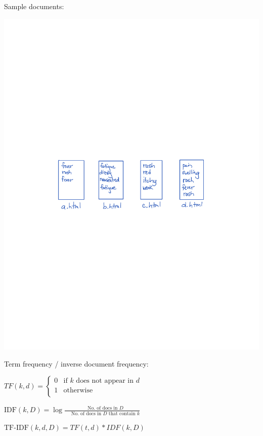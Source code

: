 \documentclass{assignment}
\begin{document}
Sample documents:

\begin{center}
\includegraphics[width=6in]{sample_documents.pdf}
\end{center}
\vspace*{-0.5cm}
Term frequency / inverse document frequency:

\hspace*{0.5 in}$TF(k, d) =
  \begin{cases}
    0       & \text{if } k \text{ does not appear in } d \\
    1       & \text{otherwise}
    \\
    \end{cases}$

\hspace*{0.5 in}$\text{IDF}(k, D) =
     \log \frac{ \quad \text{ No. of docs in } D }{ \quad \text{ No. of docs in } D \text{ that contain } k} $

\hspace*{0.5 in}$\text{TF-IDF}(k, d, D) = TF(t, d) * IDF(k, D)$
\end{document}
